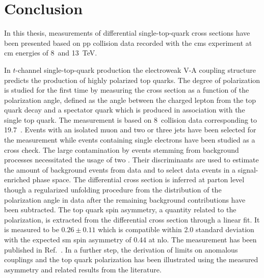 \chapter*{Conclusion}

In this thesis, measurements of differential single-top-quark cross sections have been presented based on \acrlong{pp} collision data recorded with the \gls{cms} experiment at \acrlong{cm} energies of 8~and 13~TeV.

In $t$-channel single-top-quark production the electroweak V-A coupling structure predicts the production of highly polarized top quarks. The degree of polarization is studied for the first time by measuring the cross section as a function of the polarization angle, defined as the angle between the charged lepton from the top quark decay and a spectator quark which is produced in association with the single top quark. The measurement is based on 8~\TeV collision data corresponding to 19.7~\invfb. Events with an isolated muon and two or three jets have been selected for the measurement while events containing single electrons have been studied as a cross check. The large contamination by events stemming from background processes necessitated the usage of two . Their discriminants are used to estimate the amount of background events from data and to select data events in a signal-enriched phase space. The differential cross section is inferred at parton level though a regularized unfolding procedure from the distribution of the polarization angle in data after the remaining background contributions have been subtracted. The top quark spin asymmetry, a quantity related to the polarization, is extracted from the differential cross section through a linear fit. It is measured to be $0.26\pm 0.11$ which is compatible within 2.0 standard deviation with the expected \gls{sm} spin asymmetry of 0.44 at \gls{nlo}. The measurement has been published in Ref.~\cite{Khachatryan:2015dzz}. In a further step, the derivation of limits on anomalous couplings and the top quark polarization has been illustrated using the measured asymmetry and related results from the literature.

